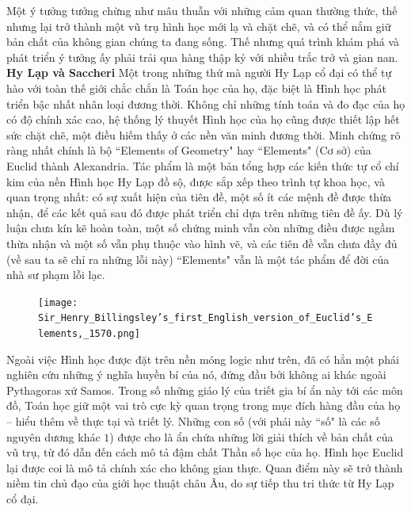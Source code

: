 \begin{multicols}{2}		
	Một ý tưởng tưởng chừng như mâu thuẫn với những cảm quan thường thức, thế nhưng lại trở thành một vũ trụ hình học mới lạ và chặt chẽ, và có thể nắm giữ bản chất của không gian chúng ta đang sống. Thế nhưng quá trình khám phá và phát triển ý tưởng ấy phải trải qua hàng thập kỷ với nhiều trắc trở và gian nan.
	\vskip 0.1cm
	\textbf{\color{lichsutoanhoc}Hy Lạp và Saccheri}
	\vskip 0.1cm
	Một trong những thứ mà người Hy Lạp cổ đại có thể tự hào với toàn thế giới chắc chắn là Toán học của họ, đặc biệt là Hình học phát triển bậc nhất nhân loại đương thời. Không chỉ những tính toán và đo đạc của họ có độ chính xác cao, hệ thống lý thuyết Hình học của họ cũng được thiết lập hết sức chặt chẽ, một điều hiếm thấy ở các nền văn minh đương thời. Minh chứng rõ ràng nhất chính là bộ ``Elements of Geometry" hay ``Elements" (Cơ sở) của Euclid thành Alexandria. Tác phẩm là một bản tổng hợp các kiến thức tự cổ chí kim của nền Hình học Hy Lạp đồ sộ, được sắp xếp theo trình tự khoa học, và quan trọng nhất: có sự xuất hiện của tiên đề, một số ít các mệnh đề được thừa nhận, để các kết quả sau đó được phát triển chỉ dựa trên những tiên đề ấy. Dù lý luận chưa kín kẽ hoàn toàn, một số chứng minh vẫn còn những điều được ngầm thừa nhận và một số vẫn phụ thuộc vào hình vẽ, và các tiên đề vẫn chưa đầy đủ (về sau ta sẽ chỉ ra những lỗi này) ``Elements" vẫn là một tác phẩm để đời của nhà sư phạm lỗi lạc. 
	\begin{figure}[H]
		\vspace*{-5pt}
		\centering
		\captionsetup{labelformat= empty, justification=centering}
		\texttt{[image: Sir\_Henry\_Billingsley's\_first\_English\_version\_of\_Euclid's\_Elements,\_1570.png]}
		\vspace*{-15pt}
	\end{figure}
	Ngoài việc Hình học được đặt trên nền móng logic như trên, đã có hẳn một phái nghiên cứu những ý nghĩa huyền bí của nó, đứng đầu bởi không ai khác ngoài Pythagoras xứ Samos. Trong số những giáo lý của triết gia bí ẩn này tới các môn đồ, Toán học giữ một vai trò cực kỳ quan trọng trong mục đích hàng đầu của họ -- hiểu thêm về thực tại và triết lý. Những con số (với phái này ``số" là các số nguyên dương khác $1$) được cho là ẩn chứa những lời giải thích về bản chất của vũ trụ, từ đó dẫn đến cách mô tả đậm chất Thần số học của họ. Hình học Euclid lại được coi là mô tả chính xác cho không gian thực. Quan điểm này sẽ trở thành niềm tin chủ đạo của giới học thuật châu Âu, do sự tiếp thu tri thức từ Hy Lạp cổ đại.

\end{multicols}
